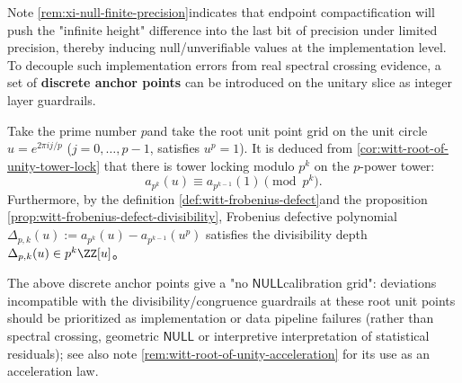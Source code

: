 \begin{remark}\label{rem:xi-null-frobenius-calibration}
Note \ref{rem:xi-null-finite-precision} ​​indicates that endpoint compactification will push the "infinite height" difference into the last bit of precision under limited precision, thereby inducing null/unverifiable values ​​at the implementation level.
To decouple such implementation errors from real spectral crossing evidence, a set of \textbf{discrete anchor points} can be introduced on the unitary slice as integer layer guardrails.
\par
Take the prime number \(p\) ​​and take the root unit point grid on the unit circle
\(
u=e^{2\pi i j/p}
\) (\(j=0,\dots,p-1\), satisfies \(u^p=1\)).
It is deduced from \ref{cor:witt-root-of-unity-tower-lock} that there is tower locking modulo \(p^k\) on the \(p\)-power tower:
\[
a_{p^k}(u)\equiv a_{p^{k-1}}(1)\pmod{p^k}.
\]
Furthermore, by the definition \ref{def:witt-frobenius-defect} ​​and the proposition \ref{prop:witt-frobenius-defect-divisibility}, Frobenius defective polynomial
\(
\Delta_{p,k}(u):=a_{p^k}(u)-a_{p^{k-1}}(u^p)
\)
satisfies the divisibility depth
\(
\Delta_{p,k}(u)\in p^k\ZZ[u]
\)。
\par
The above discrete anchor points give a "no \(\mathsf{NULL}\) ​​calibration grid": deviations incompatible with the divisibility/congruence guardrails at these root unit points should be prioritized as implementation or data pipeline failures (rather than spectral crossing, geometric \(\mathsf{NULL}\) or interpretive interpretation of statistical residuals); see also note \ref{rem:witt-root-of-unity-acceleration} for its use as an acceleration law.
\end{remark}

